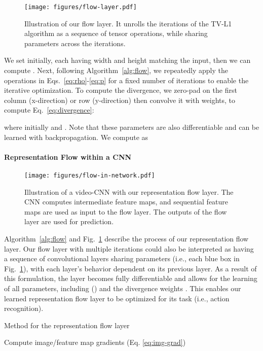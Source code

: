 \documentclass[10pt,twocolumn,letterpaper]{article}
\begin{document}
\begin{figure}
    \centering
      \texttt{[image: figures/flow-layer.pdf]}
      \caption{Illustration of our flow layer. It unrolls the iterations of the TV-L1 algorithm as a sequence of tensor operations, while sharing parameters across the iterations.}
      \label{fig:flow-layer}
\end{figure}

We set  initially, each having width and height matching the input, then we can compute . Next, following Algorithm~\ref{alg:flow}, we repeatedly apply the operations in Eqs.~\ref{eq:rho}-\ref{eq:p} for a fixed number of iterations to enable the iterative optimization. 
To compute the divergence, we zero-pad  on the first column (x-direction) or row (y-direction) then convolve it with weights,  to compute Eq.~\ref{eq:divergence}:

where initially  and . Note that these parameters are also differentiable and can be learned with backpropagation. We compute  as


\vspace{-3pt}
\paragraph{Representation Flow within a CNN}
\begin{figure*}
    \centering
      \texttt{[image: figures/flow-in-network.pdf]}
      \caption{Illustration of a video-CNN with our representation flow layer. The CNN computes intermediate feature maps, and sequential feature maps are used as input to the flow layer. The outputs of the flow layer are used for prediction.}
      \label{fig:flow-method}
\end{figure*}


Algorithm~\ref{alg:flow} and Fig.~\ref{fig:flow-layer} describe the process of our representation flow layer.
Our flow layer with multiple iterations could also be interpreted as having a sequence of convolutional layers sharing parameters (i.e., each blue box in Fig.~\ref{fig:flow-layer}), with each layer's behavior dependent on its previous layer. As a result of this formulation, the layer becomes fully differentiable and allows for the learning of all parameters, including () and the divergence weights . This enables our learned representation flow layer to be optimized for its task (i.e., action recognition).

\begin{algorithm}  
  \caption{Method for the representation flow layer
    \label{alg:flow}}  
  \begin{algorithmic}  
    \State 
    \State Compute image/feature map gradients (Eq. \ref{eq:img-grad})
    \State 
       \State 
        \State 
        \State 
        \State 
    \EndFor
    \State \Return 
    \EndFunction
  \end{algorithmic}  
\end{algorithm}
\end{document}
